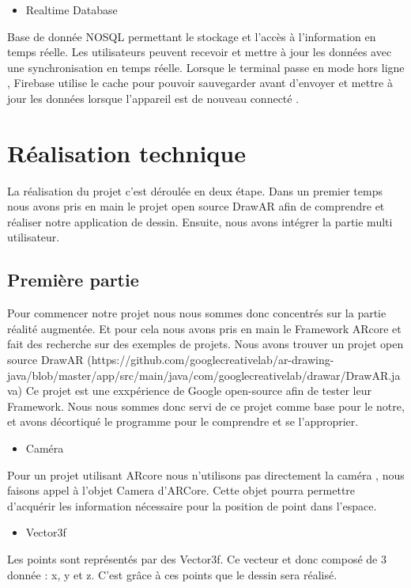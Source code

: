 \documentclass[12pt]{article}
\begin{document}
	\begin{itemize}
		\item Realtime Database
	\end{itemize}
	\par
	Base de donnée NOSQL permettant le stockage et l'accès à l'information en temps réelle. Les utilisateurs peuvent recevoir et mettre à jour les données avec une synchronisation en temps réelle. Lorsque le terminal passe en mode hors ligne , Firebase utilise le cache pour pouvoir sauvegarder avant d'envoyer et mettre à jour les données lorsque l'appareil est de nouveau connecté .
\section{Réalisation technique}
\par
La réalisation du projet c'est déroulée en deux étape. Dans un premier temps nous avons pris en main le projet open source DrawAR afin de comprendre et réaliser notre application de dessin. Ensuite, nous avons intégrer la partie multi utilisateur.
	\subsection{Première partie}
	\par
	Pour commencer notre projet nous nous sommes donc concentrés sur la partie réalité augmentée. Et pour cela nous avons pris en main le Framework ARcore et fait des recherche sur des exemples de projets. Nous avons trouver un projet open source DrawAR (https://github.com/googlecreativelab/ar-drawing-java/blob/master/app/src/main/java/com/googlecreativelab/drawar/DrawAR.java)  Ce projet est une exxpérience de Google open-source afin de tester leur Framework. Nous nous sommes donc servi de ce projet comme base pour le notre, et avons décortiqué le programme pour le comprendre et se l'approprier. 
	\begin{itemize}
		\item Caméra
	\end{itemize}
	\par
	Pour un projet utilisant ARcore nous n'utilisons pas directement la caméra , nous faisons appel à l'objet Camera d'ARCore. Cette objet pourra permettre d'acquérir les information nécessaire pour la position de point dans l'espace.

	\begin{itemize}
		\item Vector3f
	\end{itemize}
	\par
	Les points sont représentés par des Vector3f. Ce vecteur et donc composé de 3 donnée : x, y et z. C'est grâce à ces points que le dessin sera réalisé.
\end{document}
